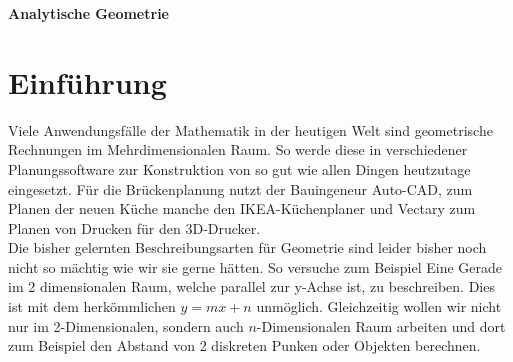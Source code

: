 \documentclass[a4paper,12pt]{article}
\newcommand{\Uebungsblatt}{Analytische Geometrie}
\begin{document}
	\pagestyle{fancy}
	\begin{center}
		\LARGE \sf \textbf{ \Uebungsblatt{}}
	\end{center}
	
	\vspace*{0.1cm}
	
		
	
	\section{Einführung}
	Viele Anwendungsfälle der Mathematik in der heutigen Welt sind geometrische Rechnungen im Mehrdimensionalen Raum. So werde diese in verschiedener Planungssoftware zur Konstruktion von so gut wie allen Dingen heutzutage eingesetzt. Für die Brückenplanung nutzt der Bauingeneur Auto-CAD, zum Planen der neuen Küche manche den IKEA-Küchenplaner und Vectary zum Planen von Drucken für den 3D-Drucker.\\
	Die bisher gelernten Beschreibungsarten für Geometrie sind leider bisher noch nicht so mächtig wie wir sie gerne hätten. So versuche zum Beispiel Eine Gerade im 2 dimensionalen Raum, welche parallel zur y-Achse ist, zu beschreiben. Dies ist mit dem herkömmlichen $y=mx+n$ unmöglich. Gleichzeitig wollen wir nicht nur im 2-Dimensionalen, sondern auch $n$-Dimensionalen Raum arbeiten und dort zum Beispiel den Abstand von 2 diskreten Punken oder Objekten berechnen.\\ 
\end{document}
